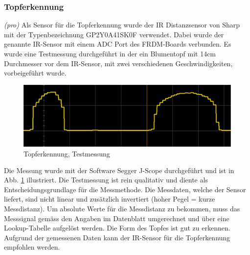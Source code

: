 \subsubsection{Topferkennung} 
\label{sec:Topferkennung_ProveOfConcept}
\textit{(pro)} Als Sensor für die Topferkennung wurde der IR Distanzsensor von Sharp mit der Typenbezeichnung GP2Y0A41SK0F verwendet. Dabei wurde der genannte IR-Sensor mit einem ADC Port des FRDM-Boards verbunden. Es wurde eine Testmessung durchgeführt in der ein Blumentopf mit 14cm Durchmesser vor dem IR-Sensor, mit zwei verschiedenen Geschwindigkeiten, vorbeigeführt wurde. 

\begin{figure}[H]
	\includegraphics[width=1\textwidth]{Illustrationen/6-Umsetzung/IR_Sensor_Messung.png}
	\caption{Topferkennung, Testmessung}
	\label{fig:IR_Sensor_POC}
\end{figure}

Die Messung wurde mit der Software Segger J-Scope durchgeführt und ist in Abb. \ref{fig:IR_Sensor_POC} illustriert. Die Testmessung ist rein qualitativ und diente als Entscheidungsgrundlage für die Messmethode. Die Messdaten, welche der Sensor liefert, sind nicht linear und zusätzlich invertiert (hoher Pegel = kurze Messdistanz). Um absolute Werte für die Messdistanz zu bekommen, muss das Messsignal gemäss den Angaben im Datenblatt umgerechnet und über eine Lookup-Tabelle aufgelöst werden. Die Form des Topfes ist gut zu erkennen. Aufgrund der gemessenen Daten kann der IR-Sensor für die Topferkennung empfohlen werden.

